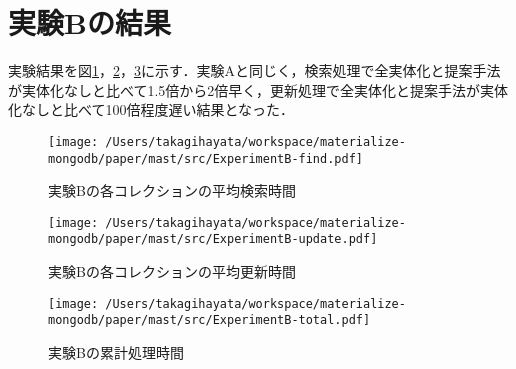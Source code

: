 \documentclass[a4paper,11pt]{ujreport}
\begin{document}
\section{実験Bの結果}
実験結果を図\ref{ExperimentB-find}，\ref{ExperimentB-update}，\ref{ExperimentB-total}に示す．実験Aと同じく，検索処理で全実体化と提案手法が実体化なしと比べて1.5倍から2倍早く，更新処理で全実体化と提案手法が実体化なしと比べて100倍程度遅い結果となった．
\begin{figure}[htbp]
	\begin{center}
		\texttt{[image: /Users/takagihayata/workspace/materialize-mongodb/paper/mast/src/ExperimentB-find.pdf]} %
	\end{center}
	\caption{実験Bの各コレクションの平均検索時間}
	\label{ExperimentB-find}
\end{figure}
\begin{figure}[htbp]
	\begin{center}
		\texttt{[image: /Users/takagihayata/workspace/materialize-mongodb/paper/mast/src/ExperimentB-update.pdf]} %
	\end{center}
	\caption{実験Bの各コレクションの平均更新時間}
	\label{ExperimentB-update}
\end{figure}
\begin{figure}[htbp]
	\begin{center}
		\texttt{[image: /Users/takagihayata/workspace/materialize-mongodb/paper/mast/src/ExperimentB-total.pdf]} %
	\end{center}
	\caption{実験Bの累計処理時間}
	\label{ExperimentB-total}
\end{figure}
\end{document}
